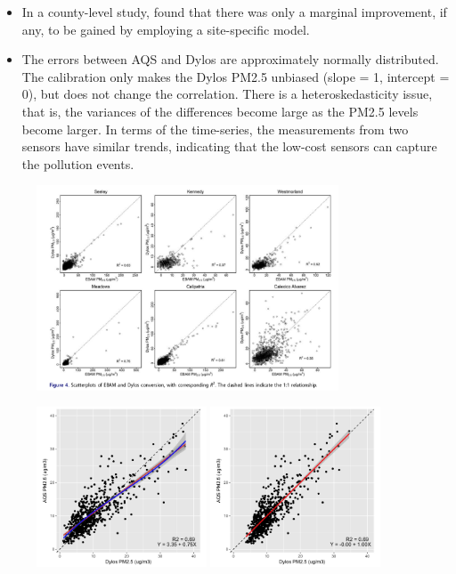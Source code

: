 \documentclass{article}
\begin{document}
\begin{itemize}
{\begin{itemize}
            \item In a county-level study, \citet{carvlin2017development} found that there was only a marginal improvement, if any, to be gained by employing a site-specific model. 
            \item The errors between AQS and Dylos are approximately normally distributed. The calibration only makes the Dylos PM2.5 unbiased (slope = 1, intercept = 0), but does not change the correlation. There is a heteroskedasticity issue, that is, the variances of the differences become large as the PM2.5 levels become larger. In terms of the time-series, the measurements from two sensors have similar trends, indicating that the low-cost sensors can capture the pollution events.
        \end{itemize}
        \begin{figure}[H]
            \centering
            \includegraphics[width=0.8\textwidth]{img/dylos.png}
            \caption{\citet{carvlin2017development}}
            \label{fig:dylos}
        \end{figure}
        \begin{figure}[H]
            \centering
            \includegraphics[width=0.45\textwidth]{img/aqs_dylos/scatter_reg.jpg} \qquad
            \includegraphics[width=0.45\textwidth]{img/aqs_dylos/scatter_adj.jpg}

\end{figure}}
\end{itemize}
\end{document}
